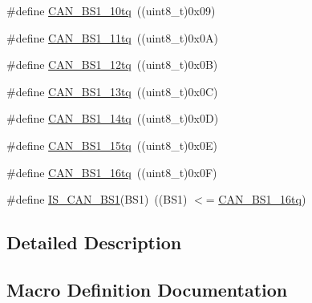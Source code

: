 \begin{DoxyCompactItemize}
\item 
\#define \mbox{\hyperlink{group___c_a_n__time__quantum__in__bit__segment__1_gaf1b474aa632787e70bedd0c5dfdbf5ed}{C\+A\+N\+\_\+\+B\+S1\+\_\+10tq}}~((uint8\+\_\+t)0x09)
\item 
\#define \mbox{\hyperlink{group___c_a_n__time__quantum__in__bit__segment__1_ga4f765ffbe7fda4fb6d0fde7bc4058a14}{C\+A\+N\+\_\+\+B\+S1\+\_\+11tq}}~((uint8\+\_\+t)0x0\+A)
\item 
\#define \mbox{\hyperlink{group___c_a_n__time__quantum__in__bit__segment__1_ga14c4e928f615babc14c6a9e80ee86a6c}{C\+A\+N\+\_\+\+B\+S1\+\_\+12tq}}~((uint8\+\_\+t)0x0\+B)
\item 
\#define \mbox{\hyperlink{group___c_a_n__time__quantum__in__bit__segment__1_ga2087caec94be44837c1e6965da7f6236}{C\+A\+N\+\_\+\+B\+S1\+\_\+13tq}}~((uint8\+\_\+t)0x0\+C)
\item 
\#define \mbox{\hyperlink{group___c_a_n__time__quantum__in__bit__segment__1_gac0c71e1020a4fbaf66bce754bd54d8cb}{C\+A\+N\+\_\+\+B\+S1\+\_\+14tq}}~((uint8\+\_\+t)0x0\+D)
\item 
\#define \mbox{\hyperlink{group___c_a_n__time__quantum__in__bit__segment__1_gaa52c8674dc7caae1089e5276cd13db5f}{C\+A\+N\+\_\+\+B\+S1\+\_\+15tq}}~((uint8\+\_\+t)0x0\+E)
\item 
\#define \mbox{\hyperlink{group___c_a_n__time__quantum__in__bit__segment__1_ga3be52c699f5618cc318c143ee42f5966}{C\+A\+N\+\_\+\+B\+S1\+\_\+16tq}}~((uint8\+\_\+t)0x0\+F)
\item 
\#define \mbox{\hyperlink{group___c_a_n__time__quantum__in__bit__segment__1_ga225f1457e1c6b8fc3b5af0f463933152}{I\+S\+\_\+\+C\+A\+N\+\_\+\+B\+S1}}(B\+S1)~((B\+S1) $<$= \mbox{\hyperlink{group___c_a_n__time__quantum__in__bit__segment__1_ga3be52c699f5618cc318c143ee42f5966}{C\+A\+N\+\_\+\+B\+S1\+\_\+16tq}})
\end{DoxyCompactItemize}


\subsection{Detailed Description}


\subsection{Macro Definition Documentation}
\mbox{\label{group___c_a_n__time__quantum__in__bit__segment__1_gaf1b474aa632787e70bedd0c5dfdbf5ed}} 
